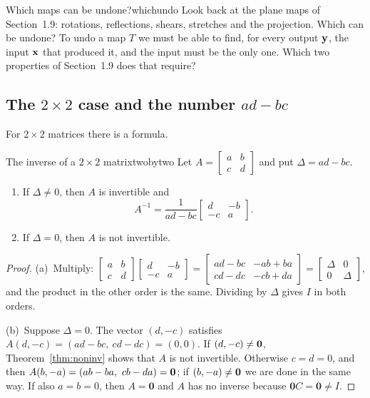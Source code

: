 \documentclass[11pt]{article}
\begin{document}
\begin{think}{Which maps can be undone?}{whichundo}
Look back at the plane maps of Section~1.9: rotations, reflections, shears, stretches and the projection. Which can be undone? To undo a map $T$ we must be able to find, for every output $\mathbf{y}$, the input $\mathbf{x}$ that produced it, and the input must be the only one. Which two properties of Section~1.9 does that require?
\end{think}

\subsection*{The $2\times2$ case and the number $ad-bc$}

For $2\times2$ matrices there is a formula.

\begin{thm}{The inverse of a $2\times2$ matrix}{twobytwo}
Let $A=\begin{bmatrix}a&b\\c&d\end{bmatrix}$ and put $\Delta=ad-bc$.
\begin{enumerate}[label=(\alph*),itemsep=1pt]
  \item If $\Delta\neq0$, then $A$ is invertible and
  \[
  A^{-1}=\frac1{ad-bc}\begin{bmatrix}d&-b\\-c&a\end{bmatrix}.
  \]
  \item If $\Delta=0$, then $A$ is not invertible.
\end{enumerate}
\end{thm}

\begin{proof}
(a)~Multiply: $\begin{bmatrix}a&b\\c&d\end{bmatrix}\begin{bmatrix}d&-b\\-c&a\end{bmatrix}=\begin{bmatrix}ad-bc&-ab+ba\\cd-dc&-cb+da\end{bmatrix}=\begin{bmatrix}\Delta&0\\0&\Delta\end{bmatrix}$, and the product in the other order is the same. Dividing by $\Delta$ gives $I$ in both orders.

(b)~Suppose $\Delta=0$. The vector $(d,-c)$ satisfies $A(d,-c)=(ad-bc,\ cd-dc)=(0,0)$. If $(d,-c)\neq\mathbf{0}$, Theorem~\ref{thm:noninv} shows that $A$ is not invertible. Otherwise $c=d=0$, and then $A(b,-a)=(ab-ba,\ cb-da)=\bv{0}$; if $(b,-a)\neq\mathbf{0}$ we are done in the same way. If also $a=b=0$, then $A=\mathbf{0}$ and $A$ has no inverse because $\mathbf{0}C=\mathbf{0}\neq I$.
\end{proof}
\end{document}
